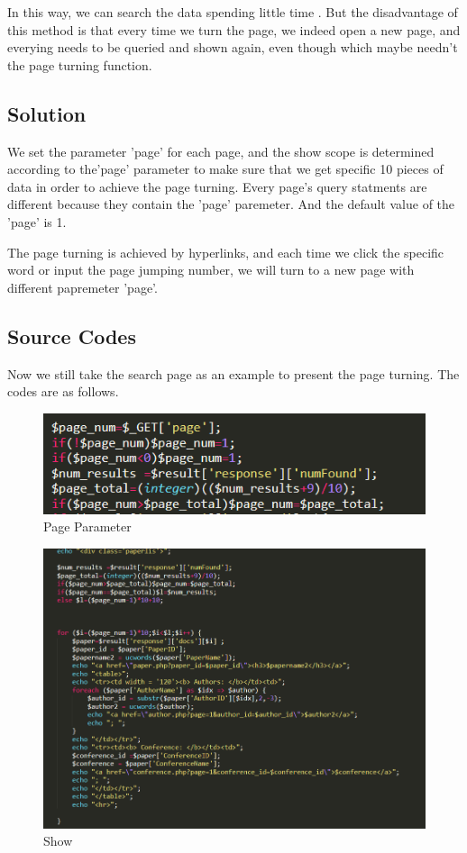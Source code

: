 \documentclass{book}
\begin{document}
In this way, we can search the data spending little time . But the disadvantage of this method is that every time we turn the page, we indeed open a new page, and everying needs to be queried and shown again, even though which maybe needn't the page turning function.

\subsection{Solution}

We set the parameter 'page' for each page, and the show scope is determined according to the'page' parameter to make sure that we get specific 10 pieces of data in order to achieve the page turning. Every page's query statments are different because they contain the 'page' paremeter. And the default value of the 'page' is 1.

The page turning is achieved by hyperlinks, and each time we click the specific word or input the page jumping number, we will turn to a new page with different papremeter 'page'.

\subsection{Source Codes}
Now we still take the search page as an example to present the page turning.  The codes are as follows.

\begin{figure}[H]
\centering
\includegraphics[scale=0.5]{img/dsw_get.png}
\caption{Page Parameter}
\end{figure}

\begin{figure}[H]
\centering
\includegraphics[scale=0.35]{img/dsw_show.png}
\caption{Show}
\end{figure}
\end{document}
